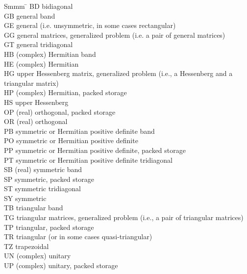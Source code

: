 \begin{tabbing}
Smmm \= \kill
BD  \>  bidiagonal \\
GB  \>  general band \\
GE  \>  general (i.e. unsymmetric, in some cases rectangular) \\
GG  \>  general matrices, generalized problem (i.e. a pair of general matrices)\\
GT  \>  general tridiagonal \\
HB  \>  (complex) Hermitian band \\
HE  \>  (complex) Hermitian \\
HG  \>  upper Hessenberg matrix, generalized problem (i.e., a Hessenberg and a \\
    \>  triangular matrix) \\
HP  \>  (complex) Hermitian, packed storage \\
HS  \>  upper Hessenberg \\
OP  \>  (real) orthogonal, packed storage \\
OR  \>  (real) orthogonal \\
PB  \>  symmetric or Hermitian positive definite band \\
PO  \>  symmetric or Hermitian positive definite \\
PP  \>  symmetric or Hermitian positive definite, packed storage \\
PT  \>  symmetric or Hermitian positive definite tridiagonal \\
SB  \>  (real) symmetric band \\
SP  \>  symmetric, packed storage \\
ST  \>  symmetric tridiagonal \\
SY  \>  symmetric \\
TB  \>  triangular band \\
TG  \>  triangular matrices, generalized problem (i.e., a pair of triangular
       matrices) \\
TP  \>  triangular, packed storage \\
TR  \>  triangular (or in some cases quasi-triangular)\\
TZ  \>  trapezoidal \\
UN  \>  (complex) unitary \\
UP  \>  (complex) unitary, packed storage \\
\end{tabbing}


